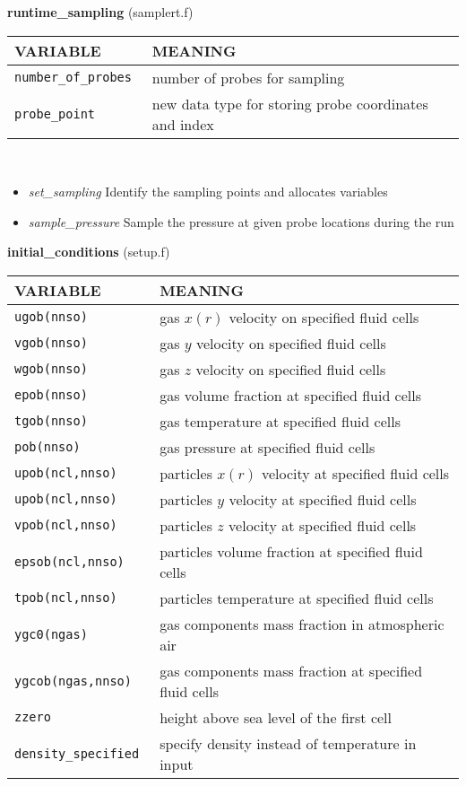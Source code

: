 %
%
{\large{\bf runtime\_sampling}} (samplert.f)\\[5mm]
\begin{tabular}{|p{6cm}|p{6cm}|}\hline
VARIABLE & MEANING\\\hline
\tt number\_of\_probes & number of probes for sampling \\\hline
\tt probe\_point & new data type for storing probe coordinates and index  \\\hline
\end{tabular}\\[5mm]
\begin{itemize}
\item {\em set\_sampling} Identify the sampling points and allocates variables
\item {\em sample\_pressure} Sample the pressure at given probe locations during the run
\end{itemize}
%
%
{\large{\bf initial\_conditions}} (setup.f)\\[5mm]
\begin{tabular}{|p{6cm}|p{6cm}|}\hline
VARIABLE & MEANING\\\hline
\tt ugob(nnso) & gas $x(r)$ velocity on specified fluid cells\\\hline 
\tt vgob(nnso) & gas $y$ velocity on specified fluid cells\\\hline
\tt wgob(nnso) & gas $z$ velocity on specified fluid cells\\\hline
\tt epob(nnso) & gas volume fraction at specified fluid cells\\\hline
\tt  tgob(nnso) & gas temperature at specified fluid cells\\\hline
\tt pob(nnso) & gas pressure at specified fluid cells\\\hline
\tt upob(ncl,nnso) & particles $x(r)$ velocity at specified fluid cells\\\hline
\tt upob(ncl,nnso) & particles $y$ velocity at specified fluid cells\\\hline
\tt vpob(ncl,nnso) & particles $z$ velocity at specified fluid cells\\\hline
\tt epsob(ncl,nnso) & particles volume fraction at specified fluid cells\\\hline
\tt tpob(ncl,nnso) & particles temperature at specified fluid cells\\\hline
\tt ygc0(ngas) & gas components mass fraction in atmospheric air\\\hline
\tt ygcob(ngas,nnso) & gas components mass fraction at specified fluid cells\\\hline
\tt zzero & height above sea level of the first cell\\\hline
\tt density\_specified & specify density instead of temperature in input\\\hline
\end{tabular}\\
